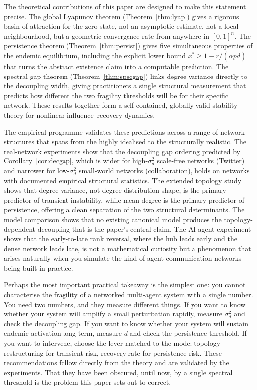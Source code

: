 \documentclass[10pt,twocolumn]{article}
\theoremstyle{myproof}
\newcommand{\xst}{x^*}
\begin{document}
The theoretical contributions of this paper are designed to make this statement precise. The
global Lyapunov theorem (Theorem~\ref{thm:lyap}) gives a rigorous basin of attraction for the
zero state, not an asymptotic estimate, not a local neighbourhood, but a geometric convergence
rate from anywhere in $[0,1]^n$. The persistence theorem (Theorem~\ref{thm:persist}) gives five
simultaneous properties of the endemic equilibrium, including the explicit lower bound
$\xst\geq 1-r/(\alpha p\bar{d})$ that turns the abstract existence claim into a computable
prediction. The spectral gap theorem (Theorem~\ref{thm:specgap}) links degree variance directly
to the decoupling width, giving practitioners a single structural measurement that predicts how
different the two fragility thresholds will be for their specific network. These results together
form a self-contained, globally valid stability theory for nonlinear influence--recovery dynamics.

The empirical programme validates these predictions across a range of network structures that
spans from the highly idealised to the structurally realistic. The real-network experiments
show that the decoupling gap ordering predicted by Corollary~\ref{cor:decgap}, which is wider for
high-$\sigma^2_d$ scale-free networks (Twitter) and narrower for low-$\sigma^2_d$ small-world
networks (collaboration), holds on networks with documented empirical structural statistics.
The extended topology study shows that degree variance, not degree distribution shape, is the
primary predictor of transient instability, while mean degree is the primary predictor of
persistence, offering a clean separation of the two structural determinants. The model comparison shows
that no existing canonical model produces the topology-dependent decoupling that is the paper's
central claim. The AI agent experiment shows that the early-to-late rank reversal, where the hub
leads early and the dense network leads late, is not a mathematical curiosity but a phenomenon that arises
naturally when you simulate the kind of agent communication networks being built in practice.

Perhaps the most important practical takeaway is the simplest one: you cannot characterise the
fragility of a networked multi-agent system with a single number. You need two numbers, and they
measure different things. If you want to know whether your system will amplify a small perturbation
rapidly, measure $\sigma^2_d$ and check the decoupling gap. If you want to know whether your
system will sustain endemic activation long-term, measure $\bar{d}$ and check the persistence
threshold. If you want to intervene, choose the lever matched to the mode: topology restructuring
for transient risk, recovery rate for persistence risk. These recommendations follow directly from
the theory and are validated by the experiments. That they have been obscured, until now, by a
single spectral threshold is the problem this paper sets out to correct.

\vspace{4pt}
{\small
}
\end{document}
